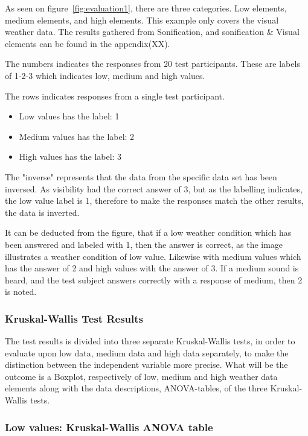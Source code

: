As seen on figure~\ref{fig:evaluation1}, there are three categories. 
Low elements, medium elements, and high elements. 
This example only covers the visual weather data. 
The results gathered from Sonification, and sonification \& Visual elements can be found in the appendix(XX).


The numbers indicates the responses from 20 test participants. 
These are labels of 1-2-3 which indicates low, medium and high values.

The rows indicates responses from a single test participant.

\begin{itemize}
    \item Low values has the label: 1
    \item Medium values has the label: 2
    \item High values has the label: 3
\end{itemize}

The "inverse" represents that the data from the specific data set has been inversed. As visibility had the correct answer of 3, but as the labelling indicates, the low value label is 1, therefore to make the responses match the other results, the data is inverted.

It can be deducted from the figure, that if a low weather condition which has been answered and labeled with 1, then the answer is correct, as the image illustrates a weather condition of low value. 
Likewise with medium values which has the answer of 2 and high values with the answer of 3. 
If a medium sound is heard, and the test subject answers correctly with a response of medium, then 2 is noted.

\subsubsection{Kruskal-Wallis Test Results} %
\label{ssub:kruskal_wallis_test_results}

The test results is divided into three separate Kruskal-Wallis tests, in order to evaluate upon low data, medium data and high data separately, to make the distinction between the independent variable more precise. 
What will be the outcome is a Boxplot, respectively of low, medium and high weather data elements along with the data descriptions, ANOVA-tables, of the three Kruskal-Wallis tests. 


\subsubsection*{Low values: Kruskal-Wallis ANOVA table} %
\label{ssub:low_values_kruskal_wallis_anova_table}


